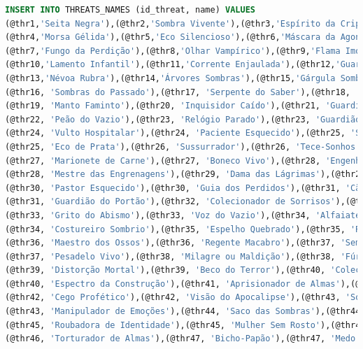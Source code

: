 \documentclass[12pt,a4paper]{report}
\begin{document}
\begin{lstlisting}[language=SQL, caption=population.sql]
INSERT INTO THREATS_NAMES (id_threat, name) VALUES
(@thr1,'Seita Negra'),(@thr2,'Sombra Vivente'),(@thr3,'Espírito da Cripta'),
(@thr4,'Morsa Gélida'),(@thr5,'Eco Silencioso'),(@thr6,'Máscara da Agonia'),
(@thr7,'Fungo da Perdição'),(@thr8,'Olhar Vampírico'),(@thr9,'Flama Imortal'),
(@thr10,'Lamento Infantil'),(@thr11,'Corrente Enjaulada'),(@thr12,'Guardião de Pedra'),
(@thr13,'Névoa Rubra'),(@thr14,'Árvores Sombras'),(@thr15,'Gárgula Sombria'),
(@thr16, 'Sombras do Passado'),(@thr17, 'Serpente do Saber'),(@thr18, 'O Corvo dos Olhos'),
(@thr19, 'Manto Faminto'),(@thr20, 'Inquisidor Caído'),(@thr21, 'Guardião dos Nomes'),
(@thr22, 'Peão do Vazio'),(@thr23, 'Relógio Parado'),(@thr23, 'Guardião do Tempo'),
(@thr24, 'Vulto Hospitalar'),(@thr24, 'Paciente Esquecido'),(@thr25, 'Serpente Prateada'),
(@thr25, 'Eco de Prata'),(@thr26, 'Sussurrador'),(@thr26, 'Tece-Sonhos'),
(@thr27, 'Marionete de Carne'),(@thr27, 'Boneco Vivo'),(@thr28, 'Engenheiro Caótico'),
(@thr28, 'Mestre das Engrenagens'),(@thr29, 'Dama das Lágrimas'),(@thr29, 'Chorona'),
(@thr30, 'Pastor Esquecido'),(@thr30, 'Guia dos Perdidos'),(@thr31, 'Cão Tricéfalo'),
(@thr31, 'Guardião do Portão'),(@thr32, 'Colecionador de Sorrisos'),(@thr32, 'Rosto Sem Boca'),
(@thr33, 'Grito do Abismo'),(@thr33, 'Voz do Vazio'),(@thr34, 'Alfaiate de Almas'),
(@thr34, 'Costureiro Sombrio'),(@thr35, 'Espelho Quebrado'),(@thr35, 'Reflexo Fragmentado'),
(@thr36, 'Maestro dos Ossos'),(@thr36, 'Regente Macabro'),(@thr37, 'Semeador de Pesadelos'),
(@thr37, 'Pesadelo Vivo'),(@thr38, 'Milagre ou Maldição'),(@thr38, 'Fúria Santa'),
(@thr39, 'Distorção Mortal'),(@thr39, 'Beco do Terror'),(@thr40, 'Colecionadora de Ossos'),
(@thr40, 'Espectro da Construção'),(@thr41, 'Aprisionador de Almas'),(@thr41, 'Menino do Espelho'),
(@thr42, 'Cego Profético'),(@thr42, 'Visão do Apocalipse'),(@thr43, 'Sorriso Insano'),
(@thr43, 'Manipulador de Emoções'),(@thr44, 'Saco das Sombras'),(@thr44, 'Homem do Saco'),
(@thr45, 'Roubadora de Identidade'),(@thr45, 'Mulher Sem Rosto'),(@thr46, 'Padre Fantasma'),
(@thr46, 'Torturador de Almas'),(@thr47, 'Bicho-Papão'),(@thr47, 'Medo Infantil');
 

\end{lstlisting}
\end{document}
